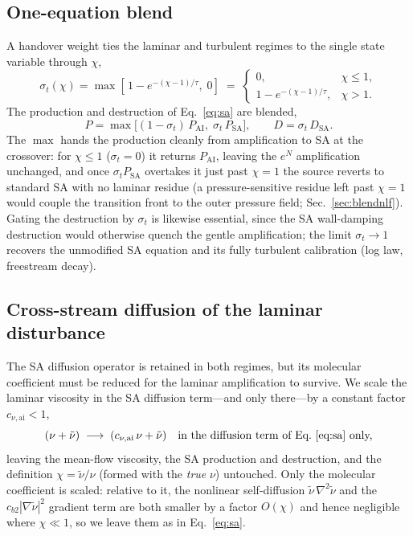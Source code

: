 \documentclass[journal]{new-aiaa}
\begin{document}
\subsection{One-equation blend}
A handover weight ties the laminar and turbulent regimes to the single state
variable through $\chi$,
\begin{equation}
  \sigma_t(\chi) = \max\!\left[\,1-e^{-(\chi-1)/\tau},\;0\right] \;=\;
  \begin{cases} 0, & \chi \le 1, \\ 1-e^{-(\chi-1)/\tau}, & \chi > 1. \end{cases}
  \label{eq:sigma}
\end{equation}
The
production and destruction of Eq.~\eqref{eq:sa} are blended,
\begin{equation}
  P = \max\!\big[(1-\sigma_t)\,P_\mathrm{AI},\;\sigma_t\,P_\mathrm{SA}\big], \qquad
  D = \sigma_t\,D_\mathrm{SA}.
  \label{eq:blend}
\end{equation}
The $\max$ hands the production cleanly from amplification to SA at the
crossover: for $\chi\!\le\!1$ ($\sigma_t\!=\!0$) it returns $P_\mathrm{AI}$,
leaving the $e^N$ amplification unchanged, and once $\sigma_t P_\mathrm{SA}$
overtakes it just past $\chi\!=\!1$ the source reverts to standard SA with no
laminar residue (a pressure-sensitive residue left past $\chi\!=\!1$ would couple
the transition front to the outer pressure field; Sec.~\ref{sec:blendnlf}).
Gating the destruction by $\sigma_t$ is likewise
essential, since the SA wall-damping destruction would otherwise quench the
gentle amplification; the limit $\sigma_t\!\to\!1$ recovers the unmodified SA
equation and its fully turbulent calibration (log law, freestream decay).
\subsection{Cross-stream diffusion of the laminar disturbance}\label{sec:nulamscale}
The SA diffusion operator is retained in both regimes, but its molecular
coefficient must be reduced for the laminar amplification to survive. We scale
the laminar viscosity in the SA diffusion term---and only there---by a constant
factor $c_{\nu,\mathrm{ai}}\!<\!1$,
\begin{equation}
  (\nu+\tilde\nu)\;\longrightarrow\;(c_{\nu,\mathrm{ai}}\,\nu+\tilde\nu)
  \quad\text{in the diffusion term of Eq.~\eqref{eq:sa} only,}
  \label{eq:nulamscale}
\end{equation}
leaving the mean-flow viscosity, the SA production and destruction, and the
definition $\chi=\tilde\nu/\nu$ (formed with the \emph{true} $\nu$) untouched.
Only the molecular coefficient is scaled: relative to it, the nonlinear
self-diffusion $\tilde\nu\,\nabla^2\tilde\nu$ and the $c_{b2}|\nabla\tilde\nu|^2$
gradient term are both smaller by a factor $O(\chi)$ and hence
negligible where $\chi\!\ll\!1$, so we leave them as in Eq.~\eqref{eq:sa}.
\end{document}
